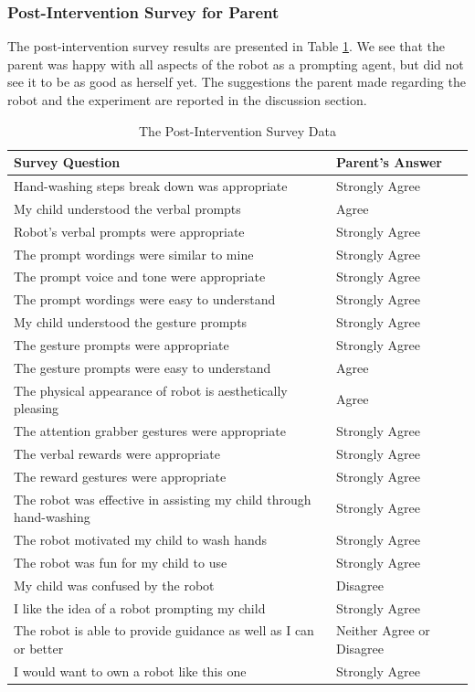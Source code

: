 \subsubsection{Post-Intervention Survey for Parent}
The post-intervention survey results are presented in Table \ref{tab:PostInterventionSurveyData}.  We see that the parent was happy with all aspects of the robot as a prompting agent, but did not see it to be as good as herself yet.  The suggestions the parent made regarding the robot and the experiment are reported in the discussion section.

\begin{table}[H]
	\centering
	\begin{tabular}{ | p{12cm} | l | }
		\hline
		\textbf{Survey Question}	&	\textbf{Parent's Answer}	\\	\hline	\hline		
		Hand-washing steps break down was appropriate	&	Strongly Agree	\\	\hline
		My child understood the verbal prompts	&	Agree	\\	\hline
		Robot's verbal prompts were appropriate	&	Strongly Agree	\\	\hline
		The prompt wordings were similar to mine	&	Strongly Agree	\\	\hline
		The prompt voice and tone were appropriate	&	Strongly Agree	\\	\hline
		The prompt wordings were easy to understand	&	Strongly Agree \\	\hline
		My child understood the gesture prompts	&	Strongly Agree	\\	\hline
		The gesture prompts were appropriate	&	Strongly Agree	\\	\hline
		The gesture prompts were easy to understand	&	Agree	\\	\hline
		The physical appearance of robot is aesthetically pleasing	&	Agree	\\	\hline
		The attention grabber gestures were appropriate	&	Strongly Agree	\\	\hline
		The verbal rewards were appropriate	&	Strongly Agree	\\	\hline
		The reward gestures were appropriate	&	Strongly Agree	\\	\hline
		The robot was effective in assisting my child through hand-washing	&	Strongly Agree	\\	\hline
		The robot motivated my child to wash hands	&	Strongly Agree	\\	\hline
		The robot was fun for my child to use	&	Strongly Agree	\\	\hline
		My child was confused by the robot	&	Disagree	\\	\hline
		I like the idea of a robot prompting my child	&	Strongly Agree	\\	\hline
		The robot is able to provide guidance as well as I can or better	&	Neither Agree or Disagree	\\	\hline
		I would want to own a robot like this one	&	Strongly Agree	\\	\hline
	\end{tabular}
	\caption{The Post-Intervention Survey Data}
	\label{tab:PostInterventionSurveyData}
\end{table}


